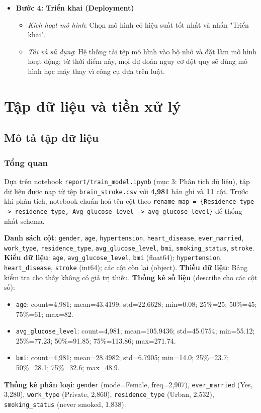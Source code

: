 ﻿\documentclass{article}
\begin{document}
\begin{itemize}
    \item \textbf{Bước 4: Triển khai (Deployment)}
    \begin{itemize}
        \item \textit{Kích hoạt mô hình}: Chọn mô hình có hiệu suất tốt nhất và nhấn "Triển khai".
        \item \textit{Tải và sử dụng}: Hệ thống tải tệp mô hình vào bộ nhớ và đặt làm mô hình hoạt động; từ thời điểm này, mọi dự đoán nguy cơ đột quỵ sẽ dùng mô hình học máy thay vì công cụ dựa trên luật.
    \end{itemize}
    
\end{itemize}

\section{Tập dữ liệu và tiền xử lý}

\subsection{Mô tả tập dữ liệu}
\subsubsection*{Tổng quan}
Dựa trên notebook \texttt{report/train\_model.ipynb} (mục 3: Phân tích dữ liệu), tập dữ liệu được nạp từ tệp \texttt{brain\_stroke.csv} với \textbf{4,981} bản ghi và \textbf{11} cột. Trước khi phân tích, notebook chuẩn hoá tên cột theo \texttt{rename\_map = \{Residence\_type -> residence\_type, Avg\_glucose\_level -> avg\_glucose\_level\}} để thống nhất schema.

\textbf{Danh sách cột}: \texttt{gender}, \texttt{age}, \texttt{hypertension}, \texttt{heart\_disease}, \texttt{ever\_married}, \texttt{work\_type}, \texttt{residence\_type}, \texttt{avg\_glucose\_level}, \texttt{bmi}, \texttt{smoking\_status}, \texttt{stroke}.
\newline
\textbf{Kiểu dữ liệu}: \texttt{age}, \texttt{avg\_glucose\_level}, \texttt{bmi} (float64); \texttt{hypertension}, \texttt{heart\_disease}, \texttt{stroke} (int64); các cột còn lại (object).\newline
\textbf{Thiếu dữ liệu}: Bảng kiểm tra cho thấy không có giá trị thiếu.\newline
\textbf{Thống kê số liệu} (describe cho các cột số):
\begin{itemize}
    \item \texttt{age}: count=4,981; mean=43.4199; std=22.6628; min=0.08; 25\%=25; 50\%=45; 75\%=61; max=82.
    \item \texttt{avg\_glucose\_level}: count=4,981; mean=105.9436; std=45.0754; min=55.12; 25\%=77.23; 50\%=91.85; 75\%=113.86; max=271.74.
    \item \texttt{bmi}: count=4,981; mean=28.4982; std=6.7905; min=14.0; 25\%=23.7; 50\%=28.1; 75\%=32.6; max=48.9.
\end{itemize}
\textbf{Thống kê phân loại}: \texttt{gender} (mode=Female, freq=2,907), \texttt{ever\_married} (Yes, 3,280), \texttt{work\_type} (Private, 2,860), \texttt{residence\_type} (Urban, 2,532), \texttt{smoking\_status} (never smoked, 1,838).
\end{document}
